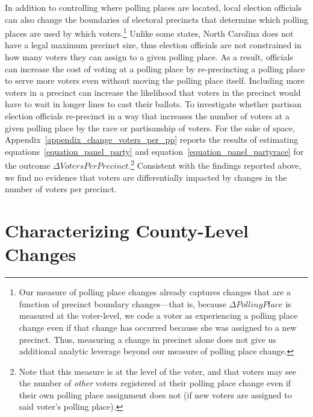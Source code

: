\documentclass[12pt]{article}
\begin{document}
In addition to controlling where polling places are located, local election officials can also change the boundaries of electoral precincts that determine which polling places are used by which voters.\footnote{Our measure of polling place changes already captures changes that are a function of precinct boundary changes---that is, because $\Delta PollingPlace$ is measured at the voter-level, we code a voter as experiencing a polling place change even if that change has occurred because she was assigned to a new precinct.  Thus, measuring a change in precinct alone does not give us additional analytic leverage beyond our measure of polling place change.} Unlike some states, North Carolina does not have a legal maximum precinct size, thus election officials are not constrained in how many voters they can assign to a given polling place.  As a result, officials can increase the cost of voting at a polling place by re-precincting a polling place to serve more voters even without moving the polling place itself. Including more voters in a precinct can increase the likelihood that voters in the precinct would have to wait in longer lines to cast their ballots. To investigate whether partisan election officials re-precinct in a way that increases the number of voters at a given polling place by the race or partisanship of voters.  For the sake of space, Appendix~\ref{appendix_change_voters_per_pp} reports the results of estimating equations~\ref{equation_panel_party} and equation~\ref{equation_panel_partyrace} for the outcome $\Delta VotersPerPrecinct$.\footnote{Note that this measure is at the level of the voter, and that voters may see the number of \emph{other} voters registered at their polling place change even if their own polling place assignment does not (if new voters are assigned to said voter's polling place).}  Consistent with the findings reported above, we find no evidence that voters are differentially impacted by changes in the number of voters per precinct.


\section{\large Characterizing County-Level Changes}\label{section_countylevelanalysis}
\vspace*{-0.5cm}
\end{document}
